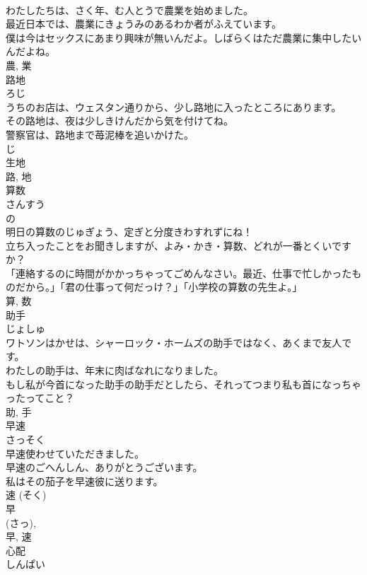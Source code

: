 \documentclass[8pt]{extreport}
\begin{document}
\begin{CJK}{UTF8}{min}
\\	わたしたちは、さく年、む人とうで農業を始めました。	
\\	最近日本では、農業にきょうみのあるわか者がふえています。	
\\	僕は今はセックスにあまり興味が無いんだよ。しばらくはただ農業に集中したいんだよね。	
\\	農, 業	
\\	路地	
\\	ろじ	
\\	うちのお店は、ウェスタン通りから、少し路地に入ったところにあります。	
\\	その路地は、夜は少しきけんだから気を付けてね。	
\\	警察官は、路地まで苺泥棒を追いかけた。	
\\	じ 
\\	生地 
\\	路, 地	
\\	算数	
\\	さんすう	
\\	の 
\\	明日の算数のじゅぎょう、定ぎと分度きわすれずにね！	
\\	立ち入ったことをお聞きしますが、よみ・かき・算数、どれが一番とくいですか？	
\\	「連絡するのに時間がかかっちゃってごめんなさい。最近、仕事で忙しかったものだから。」「君の仕事って何だっけ？」「小学校の算数の先生よ。」	
\\	算, 数	
\\	助手	
\\	じょしゅ	
\\	ワトソンはかせは、シャーロック・ホームズの助手ではなく、あくまで友人です。	
\\	わたしの助手は、年末に肉ばなれになりました。	
\\	もし私が今首になった助手の助手だとしたら、それってつまり私も首になっちゃったってこと？	
\\	助, 手	
\\	早速	
\\	さっそく	
\\	早速使わせていただきました。	
\\	早速のごへんしん、ありがとうございます。	
\\	私はその茄子を早速彼に送ります。	
\\	速 (そく) 
\\	早 
\\	(さっ), 
\\	早, 速	
\\	心配	
\\	しんぱい	

\end{CJK}
\end{document}
